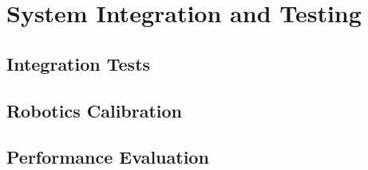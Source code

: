 \chapter{System Integration and Testing}

\setcounter{section}{0}
\setcounter{subsection}{0}

\section{Integration Tests}


\section{Robotics Calibration}


\section{Performance Evaluation}




